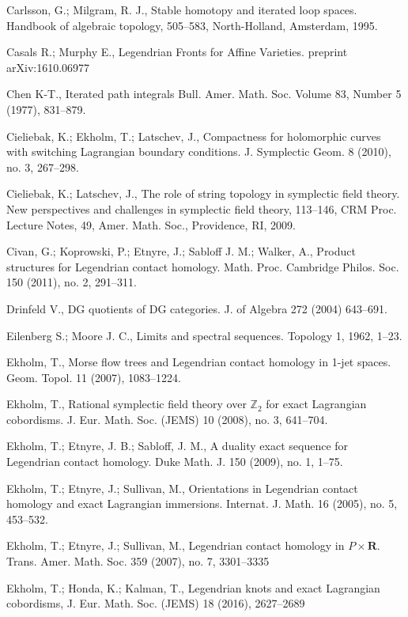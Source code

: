 \documentclass{gtpart}
\renewcommand{\R}{\mathbf{R}}
\begin{document}
\begin{thebibliography}{9999}
  Carlsson, G.; Milgram, R. J., Stable homotopy and iterated loop spaces. Handbook of algebraic topology, 505--583, North-Holland, Amsterdam, 1995.

Casals R.; Murphy E., Legendrian Fronts for Affine Varieties.
preprint arXiv:1610.06977 

 Chen K-T., Iterated path integrals Bull. Amer. Math. Soc. Volume 83, Number 5 (1977), 831--879.

	Cieliebak, K.; Ekholm, T.; Latschev, J., 
	Compactness for holomorphic curves with switching Lagrangian boundary conditions. 
	J. Symplectic Geom. 8 (2010), no. 3, 267--298.

Cieliebak, K.; Latschev, J., 
The role of string topology in symplectic field theory. New perspectives and challenges in symplectic field theory, 113--146, CRM Proc. Lecture Notes, 49, Amer. Math. Soc., Providence, RI, 2009.

 Civan, G.; Koprowski, P.; Etnyre, J.; Sabloff 
        J. M.; Walker, A., Product structures for Legendrian contact homology. Math. Proc. Cambridge
        Philos. Soc. 150 (2011), no. 2, 291--311. 

 Drinfeld V., DG quotients of DG categories. J. of Algebra 272 (2004) 643--691. 

 Eilenberg S.; Moore J. C., Limits and spectral sequences. Topology 1, 1962, 1--23.
    
 Ekholm, T., 
    Morse flow trees and Legendrian contact homology in 1-jet spaces. Geom. Topol. 11 (2007), 1083--1224.
    
    Ekholm, T., Rational symplectic field theory over $\mathbb{Z}_{2}$ for exact Lagrangian cobordisms. J. Eur. Math. Soc. (JEMS) 10 (2008), no. 3, 641--704.
    
 Ekholm, T.; Etnyre, J. B.; Sabloff, J. M., A duality exact sequence for Legendrian contact homology. Duke Math. J. 150 (2009), no. 1, 1--75. 
     
 Ekholm, T.; Etnyre, J.; Sullivan, M., Orientations in Legendrian contact homology and exact Lagrangian immersions. Internat. J. Math. 16 (2005), no. 5, 453--532.

 Ekholm, T.; Etnyre, J.; Sullivan, M., 
	Legendrian contact homology in $P\times\R$. 
	Trans. Amer. Math. Soc. 359 (2007), no. 7, 3301--3335
	
 Ekholm, T.; Honda, K.; Kalman, T., 
Legendrian knots and exact Lagrangian cobordisms,
	 J. Eur. Math. Soc. (JEMS) 18 (2016), 2627--2689
	

\end{thebibliography}
\end{document}
